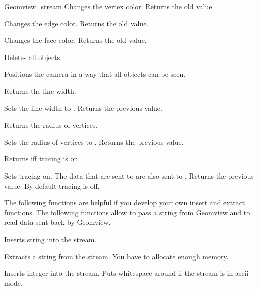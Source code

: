 \begin{ccClass}{Geomview_stream}
{Changes the vertex color. Returns the old value.}

{Changes the edge color. Returns the old value.}


{Changes the face color. Returns the old value.}



{Deletes all objects.}

{Positions the camera in a way that all objects can be seen.}

{Returns the line width.}

{Sets the line width to . Returns the previous value.}

{Returns the radius of vertices.}

{Sets the radius of vertices to . Returns the previous value.}

{Returns  iff tracing is on.}

{Sets tracing on. The data that are sent to  are also
 sent to .  Returns the previous value. By default tracing is
 off.}




\begin{ccAdvanced}


The following functions are helpful if you develop your own insert
and extract functions. The following functions allow to pass a string
from Geomview and to read data sent back by Geomview.

{Inserts string  into the stream.}


{Extracts a string  from the stream.
\ccPrecond You have to allocate enough memory.}

{Inserts integer  into the stream. Puts whitespace around if the
stream is in ascii mode.}



\end{ccAdvanced}
\end{ccClass}
